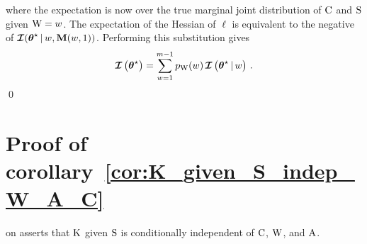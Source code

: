 \documentclass[
    11pt,
    extrafontsizes,
    article,
    oldfontcommands,
    final,
    oneside,
    openany,
    hidelinks]{memoir}
\begin{document}
where the expectation is now over the true marginal joint distribution of $\mathrm{C}$ and $\mathrm{S}$ given $\mathrm{W} = w$. The expectation of the Hessian of $\ell$ is equivalent to the negative of $\operatorname{\boldsymbol{\mathcal{I}}}({\boldsymbol{\mathbf{\theta}}}^{\star} {\,|\,} w, \boldsymbol{\mathbf{M}}(w,{1}))$. Performing this substitution gives
\begin{equation}
    \operatorname{\boldsymbol{\mathcal{I}}}\left({\boldsymbol{\mathbf{\theta}}}^{\star}\right) = \sum_{w=1}^{m-1} p_{\mathrm{W}}(w) \operatorname{\boldsymbol{\mathcal{I}}}\left({\boldsymbol{\mathbf{\theta}}}^{\star} {\,|\,} w\right)\,.
\end{equation}
\qed


\chapter{Proof of corollary~\ref{cor:K_given_S_indep_W_A_C}}
\label{app:K_given_S_indep_W_A_C}
 on  asserts that $\mathrm{K}$ given $\mathrm{S}$ is conditionally independent of $\mathrm{C}$, $\mathrm{W}$, and $\mathrm{A}$.
\end{document}
